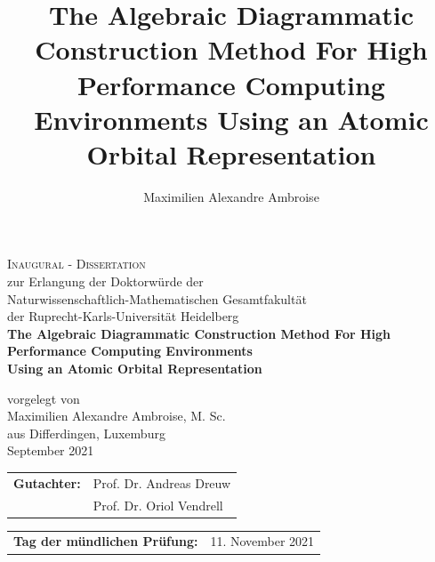 \documentclass[a4paper,12pt]{book}
\begin{document}
\author{Maximilien Alexandre Ambroise}
\title{The Algebraic Diagrammatic Construction Method For High Performance Computing Environments Using an Atomic Orbital Representation}

\begin{titlepage}
\begin{center}
{\Huge\scshape Inaugural - Dissertation \\}
{ zur Erlangung der Doktorwürde der \\
Naturwissenschaftlich-Mathematischen Gesamtfakultät \\
der Ruprecht-Karls-Universität Heidelberg \\}
\vspace{1cm}
{\huge\bfseries The Algebraic Diagrammatic Construction Method For High Performance Computing Environments \\}
{\Large\bfseries Using an Atomic Orbital Representation \\}
 
\vspace{1.5cm}
{vorgelegt von\\}
\vspace*{1.5cm}
{\Large Maximilien Alexandre Ambroise, M. Sc.}\\
\vspace{1.0cm}
{\large aus Differdingen, Luxemburg}\\
\vspace{2cm}
{September 2021} \\[5pt]
\vspace{2cm}
\end{center}

\begin{tabular}{ll}
{\bfseries Gutachter:} & Prof. Dr. Andreas Dreuw \\
 & Prof. Dr. Oriol Vendrell
\end{tabular}

\vspace{0.5cm}

\begin{tabular}{ll}
{\bfseries Tag der mündlichen Prüfung:} & {11. November 2021}
\end{tabular}

\end{titlepage}


\newpage
\end{document}
